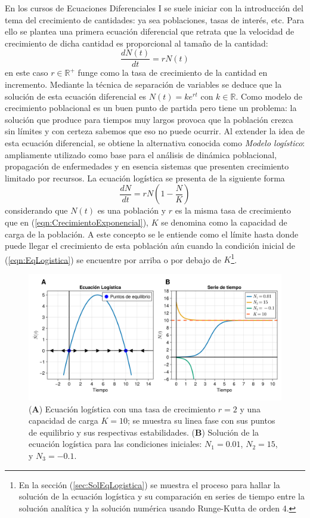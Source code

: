 En los cursos de Ecuaciones Diferenciales I se suele iniciar con la introducción del tema del crecimiento de cantidades: ya sea poblaciones, tasas de interés, etc. Para ello se plantea una primera ecuación diferencial que retrata que la velocidad de crecimiento de dicha cantidad es proporcional al tamaño de la cantidad:
\begin{equation}\label{eqn:CrecimientoExponencial}
	\frac{dN(t)}{dt}=rN(t)
\end{equation}
en este caso $r\in\mathbb{R}^+$ funge como la tasa de crecimiento de la cantidad en incremento. Mediante la técnica de separación de variables se deduce que la solución de esta ecuación diferencial es $N(t)=ke^{rt}$ con $k\in\mathbb{R}$. Como modelo de crecimiento poblacional es un buen punto de partida pero tiene un problema: la solución que produce para tiempos muy largos provoca que la población crezca sin límites y con certeza sabemos que eso no puede ocurrir. Al extender la idea de esta ecuación diferencial, se obtiene la alternativa conocida como \textit{Modelo logístico}: ampliamente utilizado como base para el análisis de dinámica poblacional, propagación de enfermedades y en esencia sistemas que presenten crecimiento limitado por recursos. La ecuación logística se presenta de la siguiente forma
\begin{equation}\label{eqn:EqLogistica}
	\frac{dN}{dt}=rN\left (1-\frac{N}{K}\right )
\end{equation}
considerando que $N(t)$ es una población y $r$ es la misma tasa de crecimiento que en (\ref{eqn:CrecimientoExponencial}), $K$ se denomina como la capacidad de carga de la población. A este concepto se le entiende como el límite hasta donde puede llegar el crecimiento de esta población aún cuando la condición inicial de (\ref{eqn:EqLogistica}) se encuentre por arriba o por debajo de $K$\footnote{En la sección (\ref{sec:SolEqLogistica}) se muestra el proceso para hallar la solución de la ecuación logística y su comparación en series de tiempo entre la solución analítica y la solución numérica usando Runge-Kutta de orden 4.}. 
\begin{figure}[h!]
	\centering
	\includegraphics[scale=0.23]{../../Imagenes/Ecuacion Logistica}
	\caption{(\textbf{A}) Ecuación logística con una tasa de crecimiento $r=2$ y una capacidad de carga $K=10$; se muestra su linea fase con sus puntos de equilibrio y sus respectivas estabilidades. (\textbf{B}) Solución de la ecuación logística para las condiciones iniciales: $N_1=0.01$, $N_2=15$, y $N_3=-0.1$.}
	\label{fig:EcuacionLogistica}
\end{figure}		

